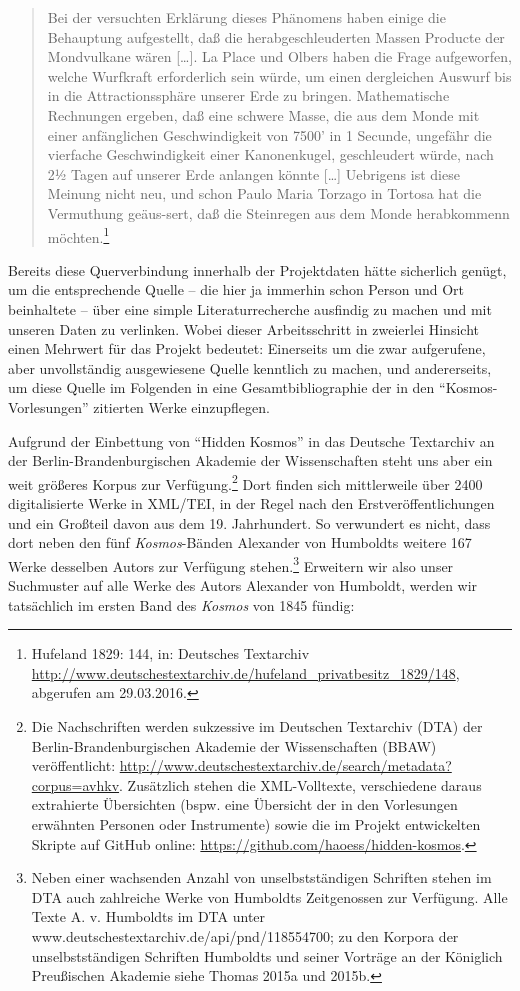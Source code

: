 \documentclass[output=paper]{langsci/langscibook}
\begin{document}
\begin{quote}
Bei der versuchten Erklärung dieses Phänomens haben einige die
Behauptung aufgestellt, daß die herabgeschleuderten Massen Producte der
Mondvulkane wären {[}\ldots{}{]}. La Place und Olbers haben die Frage
aufgeworfen, wel\-che Wurfkraft erforderlich sein würde, um einen
dergleichen Auswurf bis in die Attractionssphäre unserer Erde zu
bringen. Mathematische Rechnungen ergeben, daß eine schwere Masse, die
aus dem Monde mit einer anfänglichen Geschwindigkeit von 7500' in 1
Secunde, ungefähr die vierfache Geschwindigkeit einer Kanonenkugel,
geschleudert würde, nach 2½ Tagen auf unserer Erde anlangen könnte
{[}\ldots{}{]} Uebrigens ist diese Meinung nicht neu, und schon Paulo
Maria Torzago in Tortosa hat die Vermuthung geäus-sert, daß die
Steinregen aus dem Monde herabkommenn möchten.\footnote{Hufeland 1829:
  144, in: Deutsches Textarchiv
  \url{http://www.deutschestextarchiv.de/hufeland_privatbesitz_1829/148},
  abgerufen am 29.03.2016.}
\end{quote}

Bereits diese Querverbindung innerhalb der Projektdaten hätte sicherlich
ge\-nügt, um die entsprechende Quelle -- die hier ja immerhin schon Person
und Ort beinhaltete -- über eine simple Literaturrecherche ausfindig zu
machen und mit unseren Daten zu verlinken. Wobei dieser Arbeitsschritt
in zweierlei Hinsicht einen Mehrwert für das Projekt bedeutet:
Einerseits um die zwar aufgerufene, aber unvollständig ausgewiesene
Quelle kenntlich zu machen, und andererseits, um diese Quelle im
Folgenden in eine Gesamtbibliographie der in den
\enquote{Kosmos-Vorlesungen} zitierten Werke einzupflegen.

Aufgrund der Einbettung von \enquote{Hidden Kosmos} in das Deutsche
Textarchiv an der Berlin-Brandenburgischen Akademie der Wissenschaften
steht uns aber ein weit größeres Korpus zur Verfügung.\footnote{Die
  Nachschriften werden sukzessive im Deutschen Textarchiv (DTA) der
  Berlin-Brandenburgischen Akademie der Wissenschaften (BBAW)
  veröffentlicht:
  \url{http://www.deutschestextarchiv.de/search/metadata?corpus=avhkv}.
  Zusätzlich stehen die XML-Volltexte, verschiedene daraus extrahierte
  Übersichten (bspw. eine Übersicht der in den Vorlesungen erwähnten
  Personen oder Instrumente) sowie die im Projekt entwickelten Skripte
  auf GitHub online: \url{https://github.com/haoess/hidden-kosmos}.}
Dort finden sich mittlerweile über 2400 digitalisierte Werke in XML/TEI,
in der Regel nach den Erstveröffentlichungen und ein Großteil davon aus
dem 19. Jahrhundert. So verwundert es nicht, dass dort neben den fünf
\emph{Kosmos}-Bänden Alexander von Humboldts weitere 167 Werke desselben
Autors zur Verfügung stehen.\footnote{Neben einer wachsenden Anzahl von
  unselbstständigen Schriften stehen im DTA auch zahlreiche Werke von
  Humboldts Zeitgenossen zur Verfügung. Alle Texte A. v. Humboldts im
  DTA unter www.deutschestextarchiv.de/api/pnd/118554700; zu den Korpora
  der unselbstständigen Schriften Humboldts und seiner Vorträge an der
  Königlich Preußischen Akademie siehe Thomas 2015a und 2015b.}
Erweitern wir also unser Suchmuster auf alle Werke des Autors Alexander
von Humboldt, werden wir tatsächlich im ersten Band des \emph{Kosmos}
von 1845 fündig:
\end{document}
